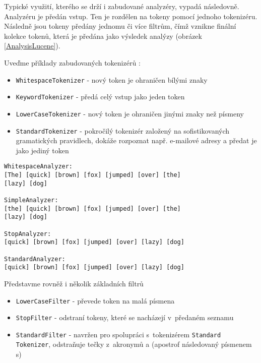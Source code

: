 \documentclass[11pt,oneside]{fithesis2}
\begin{document}
Typické využití, kterého se drží i zabudované analyzéry, vypadá následovně. Analyzéru je předán vstup. Ten je rozdělen na tokeny pomocí jednoho tokenizéru. Následně jsou tokeny předány jednomu či více filtrům, čímž vznikne finální kolekce tokenů, která je předána jako výsledek analýzy (obrázek \ref{AnalysisLucene}).

Uveďme příklady zabudovaných tokenizérů  \cite[s.~118]{LuceneAction}:

\begin{itemize}
	\item \texttt{WhitespaceTokenizer} - nový token je ohraničen bílými znaky
	\item \texttt{KeywordTokenizer} - předá celý vstup jako jeden token
	\item \texttt{LowerCaseTokenizer} - nový token je ohraničen jinými znaky než písmeny
	\item \texttt{StandardTokenizer} - pokročilý tokenizér založený na sofistikovaných gramatických pravidlech, dokáže rozpoznat např. e-mailové adresy a předat je jako jediný token
\end{itemize}

\begin{lstlisting}[caption =  Použití zabudovaných analyzérů pro větu {\emph{\uv{The quick brown fox jumped over the lazy dog}}}{,} převzato z~{\cite[str. 111]{LuceneAction}}, label = AnalysisExample1]
WhitespaceAnalyzer:
[The] [quick] [brown] [fox] [jumped] [over] [the] 
[lazy] [dog]

SimpleAnalyzer:
[the] [quick] [brown] [fox] [jumped] [over] [the] 
[lazy] [dog]

StopAnalyzer:
[quick] [brown] [fox] [jumped] [over] [lazy] [dog]

StandardAnalyzer:
[quick] [brown] [fox] [jumped] [over] [lazy] [dog]
\end{lstlisting}

Představme rovněž i několik základních filtrů  \cite[s.~118]{LuceneAction}
\begin{itemize}
	\item \texttt{LowerCaseFilter} - převede token na malá písmena
	\item \texttt{StopFilter} - odstraní tokeny, které se nacházejí v~předaném seznamu
	\item \texttt{StandardFilter} - navržen pro spolupráci s~tokenizérem \texttt{Standard\\Tokenizer}, odstraňuje tečky z~akronymů a  (apostrof následovaný písmenem s)
\end{itemize}
\end{document}
